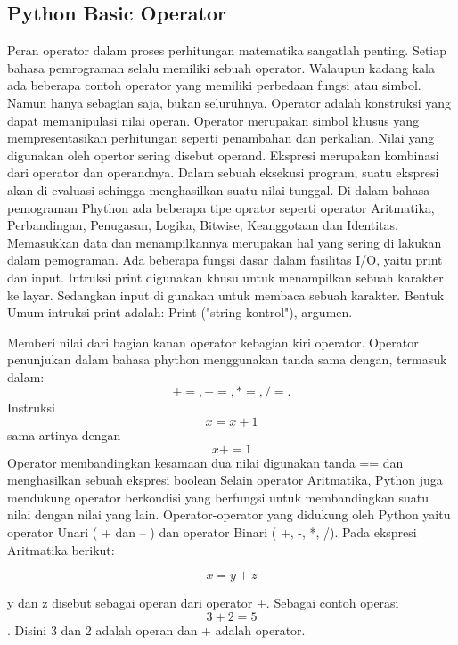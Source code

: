 \subsection{Python Basic Operator}
Peran operator dalam proses perhitungan matematika sangatlah penting.
Setiap bahasa pemrograman selalu memiliki sebuah operator. Walaupun kadang kala ada beberapa contoh operator yang memiliki perbedaan fungsi atau simbol. Namun hanya sebagian saja, bukan seluruhnya. Operator adalah konstruksi yang dapat memanipulasi nilai operan.
Operator merupakan simbol khusus yang mempresentasikan perhitungan seperti penambahan dan perkalian. Nilai yang digunakan oleh opertor sering disebut operand. Ekspresi merupakan kombinasi dari operator dan operandnya. Dalam sebuah eksekusi program, suatu ekspresi akan di evaluasi sehingga menghasilkan suatu nilai tunggal. Di dalam bahasa pemograman Phython ada beberapa tipe oprator seperti operator Aritmatika, Perbandingan, Penugasan, Logika, Bitwise, Keanggotaan dan Identitas. Memasukkan data dan menampilkannya merupakan hal yang sering di lakukan dalam pemograman. Ada beberapa fungsi dasar dalam fasilitas I/O, yaitu print dan input. Intruksi print digunakan khusu untuk menampilkan sebuah karakter ke layar. Sedangkan input di gunakan untuk membaca sebuah karakter. Bentuk Umum intruksi print adalah: Print ("string kontrol"), argumen.

Memberi nilai dari bagian kanan operator kebagian kiri operator. Operator penunjukan dalam bahasa phython menggunakan tanda sama dengan, termasuk dalam:
\begin{equation}
+=, -=, *=, /=. 
\end{equation}
Instruksi \begin{equation} x = x+1 \end{equation} sama artinya dengan \begin{equation} x +=1 \end{equation}
Operator membandingkan kesamaan dua nilai digunakan tanda == dan menghasilkan sebuah ekspresi boolean 
Selain operator Aritmatika, Python juga mendukung operator berkondisi yang berfungsi untuk membandingkan suatu nilai dengan nilai yang lain. Operator-operator yang didukung oleh Python yaitu operator Unari ( + dan – ) dan operator Binari ( +, -, *, /). Pada ekspresi Aritmatika berikut:

\begin{equation}
x = y + z
\end{equation}
 
y dan z disebut sebagai operan dari operator +.  
Sebagai contoh operasi \begin{equation} 3 + 2 = 5 \end{equation}. Disini 3 dan 2 adalah operan dan + adalah operator.

